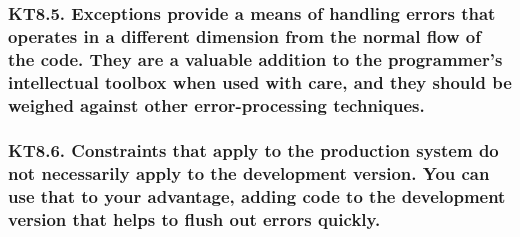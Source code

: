 \documentclass[12pt]{report}
\begin{document}
\subsubsection{KT8.5. Exceptions provide a means of handling errors that operates in a different dimension from the normal flow of the code. They are a valuable addition to the programmer's intellectual toolbox when used with care, and they should be weighed against other error-processing techniques.}

\subsubsection{KT8.6. Constraints that apply to the production system do not necessarily apply to the development version. You can use that to your advantage, adding code to the development version that helps to flush out errors quickly.}
\end{document}
